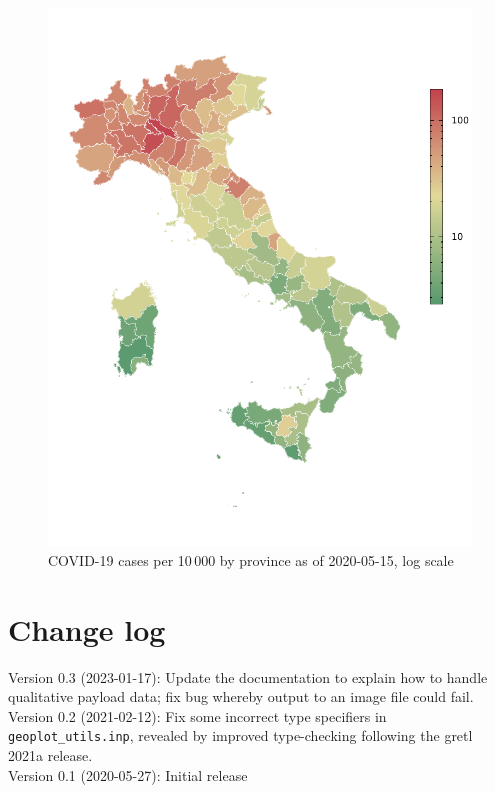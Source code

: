 \documentclass{article}
\newcommand{\startappendices}{%
\newcounter{appcount}
\setcounter{appcount}{0}
\renewcommand{\thesection}{Appendix \Alph{appcount}}}
\begin{document}
\begin{figure}[p]
  \centering
  \includegraphics{covid.pdf}
  \caption{COVID-19 cases per 10\,000 by province as of
    2020-05-15, log scale}
  \label{fig:ita-covid}
\end{figure}

\section{Change log}

Version 0.3 (2023-01-17): Update the documentation to explain how to
handle qualitative payload data; fix bug whereby output to an image
file could fail. \\[6pt]
Version 0.2 (2021-02-12): Fix some incorrect type specifiers in
\verb|geoplot_utils.inp|, revealed by improved type-checking following
the gretl 2021a release. \\[6pt]
Version 0.1 (2020-05-27): Initial release

\clearpage
\startappendices
\end{document}
